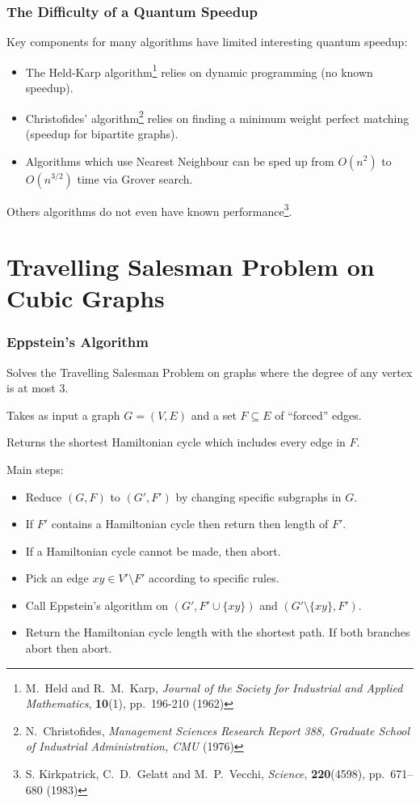 \documentclass[aspectratio=169]{beamer}
\begin{document}
\begin{frame}
\frametitle{The Difficulty of a Quantum Speedup}

Key components for many algorithms have limited interesting quantum speedup:

\begin{itemize}
\item The Held-Karp algorithm\footnote{M.\ Held and R.\ M.\ Karp, {\em Journal of the Society for Industrial and Applied Mathematics}, {\bf 10}(1), pp.\ 196-210 (1962)} relies on dynamic programming (no known speedup).
\item Christofides' algorithm\footnote{N.\ Christofides, {\em Management Sciences Research Report 388, Graduate School of Industrial Administration, CMU} (1976)} relies on finding a minimum weight perfect matching (speedup for bipartite graphs).
\item Algorithms which use Nearest Neighbour can be sped up from $O(n^2)$ to $O(n^{3/2})$ time via Grover search.
\end{itemize}

Others algorithms do not even have known performance\footnote{S. Kirkpatrick, C.\ D.\ Gelatt and M.\ P.\ Vecchi, {\em Science}, {\bf 220}(4598), pp.\ 671--680 (1983)}.
\end{frame}

\section{Travelling Salesman Problem on Cubic Graphs}

\begin{frame}
\frametitle{Eppstein's Algorithm}
Solves the Travelling Salesman Problem on graphs where the degree of any vertex is at most $3$.

Takes as input a graph $G = (V, E)$ and a set $F \subseteq E$ of ``forced'' edges.

Returns the shortest Hamiltonian cycle which includes every edge in $F$.

Main steps:
\begin{itemize}
\item Reduce $(G, F)$ to $(G', F')$ by changing specific subgraphs in $G$.
\item If $F'$ contains a Hamiltonian cycle then return then length of $F'$.
\item If a Hamiltonian cycle cannot be made, then abort.
\item Pick an edge $xy \in V' \setminus F'$ according to specific rules.
\item Call Eppstein's algorithm on $(G', F' \cup \{xy\})$ and $(G' \setminus \{xy\}, F')$.
\item Return the Hamiltonian cycle length with the shortest path. If both branches abort then abort.
\end{itemize}
\end{frame}
\end{document}
